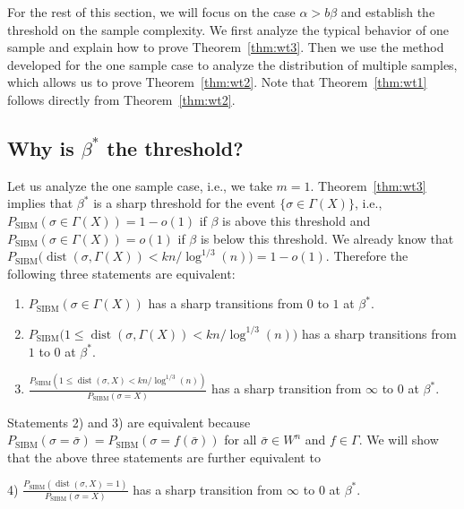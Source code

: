 \label{key}\documentclass[conference]{IEEEtran}
\DeclareMathOperator{\SIBM}{SIBM}
\DeclareMathOperator{\dist}{dist}
\begin{document}
For the rest of this section, we will focus on the case $\alpha>b\beta$ and establish the threshold on the sample complexity. We first analyze the typical behavior of one sample and explain how to prove Theorem~\ref{thm:wt3}. Then we use the method developed for the one sample case to analyze the distribution of multiple samples, which allows us to prove Theorem~\ref{thm:wt2}. Note that Theorem~\ref{thm:wt1} follows directly from Theorem~\ref{thm:wt2}.

\subsection{Why is $\beta^\ast$ the threshold?} \label{sect:why}

Let us analyze the one sample case, i.e., we take $m=1$.
Theorem~\ref{thm:wt3} implies that $\beta^\ast$ is a sharp threshold for the event $\{\sigma \in \Gamma(X)\}$, i.e., $P_{\SIBM}(\sigma\in \Gamma(X))=1-o(1)$
if $\beta$ is above this threshold and $P_{\SIBM}(\sigma\in \Gamma(X))=o(1)$ if $\beta$ is below this threshold.
We already know that
$
P_{\SIBM} \big(\dist(\sigma,\Gamma(X))< kn/\log^{1/3}(n) \big) = 1- o(1) .
$
Therefore the following three statements are equivalent:
\begin{enumerate}
\item $P_{\SIBM}(\sigma\in \Gamma(X))$ has a sharp transitions from $0$ to $1$ at $\beta^\ast$.
\item $P_{\SIBM} \big( 1\le \dist(\sigma,\Gamma(X))< kn/\log^{1/3}(n) \big)$ has a sharp transitions from $1$ to $0$ at $\beta^\ast$.
\item $\frac{P_{\SIBM} ( 1\le \dist(\sigma, X)< kn/\log^{1/3}(n) )}{P_{\SIBM}(\sigma= X)}$ has a sharp transition from $\infty$ to $0$ at $\beta^\ast$.
\end{enumerate}
Statements 2) and 3) are equivalent because $P_{\SIBM}(\sigma=\bar{\sigma})=P_{\SIBM}(\sigma=f(\bar{\sigma}))$ for all $\bar{\sigma}\in W^n$ and $f \in \Gamma$.
We will show that the above three statements are further equivalent to

4)  $\frac{P_{\SIBM} ( \dist(\sigma, X) = 1 )}{P_{\SIBM}(\sigma= X)}$ has a sharp transition from $\infty$ to $0$ at $\beta^\ast$.
\end{document}
